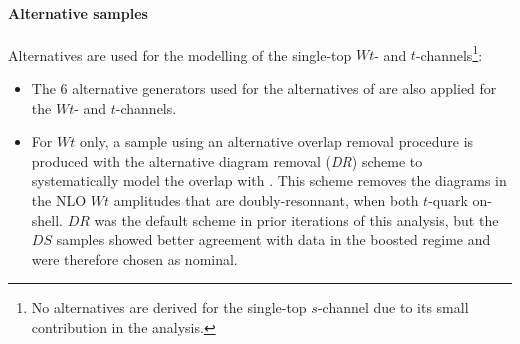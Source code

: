 \paragraph{Alternative samples} Alternatives are used for the modelling of the single-top $Wt$- and $t$-channels\footnote{No alternatives are derived for the single-top $s$-channel due to its small contribution in the analysis.}:
\begin{itemize}
  \item The 6 alternative generators used for the alternatives of \ttb are also applied for the $Wt$- and $t$-channels.
  \item For $Wt$ only, a sample using an alternative overlap removal procedure is produced with the alternative diagram removal (\textit{DR}) scheme \cite{StefanoFrixione_2008} to systematically model the overlap with \ttb. This scheme removes the diagrams in the NLO $Wt$ amplitudes that are doubly-resonnant, when both $t$-quark on-shell. $DR$ was the default scheme in prior iterations of this analysis, but the $DS$ samples showed better agreement with data in the boosted regime and were therefore chosen as nominal.
\end{itemize}

